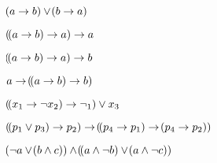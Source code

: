 \documentclass[a4paper,french,bookmarks]{book}
\begin{document}
    \begin{enumerate}
        \begin{minipage}{0.48\linewidth}
            \item $\!\left(a \rightarrow b\right) \lor \!\left(b \rightarrow a\right)$
            
            
             
            \item $\!\left(\!\left(a \rightarrow b\right) \rightarrow a\right) \rightarrow a$
            
             
            \item $\!\left(\!\left(a \rightarrow b\right) \rightarrow a\right) \rightarrow b$
             
            \item $a \rightarrow \!\left(\!\left(a \rightarrow b\right) \rightarrow b\right)$
             
            \item $\!\left(\!\left(x_1 \rightarrow \neg x_2\right) \rightarrow \neg _1\right) \lor x_3$
             
            \item $\!\left(\!\left(p_1 \lor p_3\right) \rightarrow p_2\right) \rightarrow \!\left(\!\left(p_4 \rightarrow p_1\right) \rightarrow \!\left(p_4 \rightarrow p_2\right)\right)$
    \end{minipage}
    \hfill
    \begin{minipage}{0.48\linewidth}
        \item $\!\left(\neg a \lor \!\left(b \land c\right)\right) \land \!\left(\!\left(a \land \neg b\right) \lor \!\left(a \land \neg c\right)\right)$
             

\end{minipage}
\end{enumerate}
\end{document}
